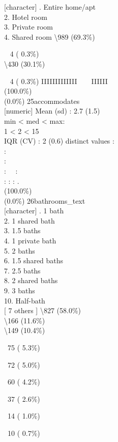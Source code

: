 \documentclass[
  journal,
]{IEEEtran}%
\begin{document}
{[}character{]} . Entire home/apt\\
2. Hotel room\\
3. Private room\\
4. Shared room \textbar\textbackslash989 (69.3\%)\\
\strut ~ 4 ( 0.3\%)\\
\textbackslash430 (30.1\%)\\
\strut ~ 4 ( 0.3\%) \textbar{} \textbar IIIIIIIIIIIII ~ ~ IIIIII ~
\\
(100.0\%) \\
(0.0\%) \textbar{} \textbar{} 25\textbar accommodates\\
{[}numeric{]} \textbar Mean (sd) : 2.7 (1.5)\\
min \textless{} med \textless{} max:\\
1 \textless{} 2 \textless{} 15\\
IQR (CV) : 2 (0.6)  distinct values \textbar{} \textbar:\\
:\\
:\\
: ~~:\\
: : : . \\
(100.0\%) \\
(0.0\%) \textbar{} \textbar{} 26\textbar bathrooms\_text\\
{[}character{]} . 1 bath\\
2. 1 shared bath\\
3. 1.5 baths\\
4. 1 private bath\\
5. 2 baths\\
6. 1.5 shared baths\\
7. 2.5 baths\\
8. 2 shared baths\\
9. 3 baths\\
10. Half-bath\\
{[} 7 others {]} \textbar\textbackslash827 (58.0\%)\\
\textbackslash166 (11.6\%)\\
\textbackslash149 (10.4\%)\\
\strut ~75 ( 5.3\%)\\
\strut ~72 ( 5.0\%)\\
\strut ~60 ( 4.2\%)\\
\strut ~37 ( 2.6\%)\\
\strut ~14 ( 1.0\%)\\
\strut ~10 ( 0.7\%)\\
\end{document}
